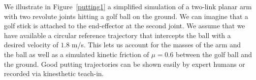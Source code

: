 We illustrate in Figure~\ref{putting1} a simplified simulation of a two-link planar arm with two revolute joints hitting a golf ball on the ground. We can imagine that a golf stick is attached to the end-effector at the second joint. We assume that we have available a circular reference trajectory that intercepts the ball with a desired velocity of $1.8$ m/s. This lets us account for the masses of the arm and the ball as well as a simulated kinetic friction of $\mu = 0.6$ between the golf ball and the ground. Good putting trajectories can be shown easily by expert humans or recorded via kinesthetic teach-in. 


\begin{figure}[ht]
\centering
{}
\end{figure}
